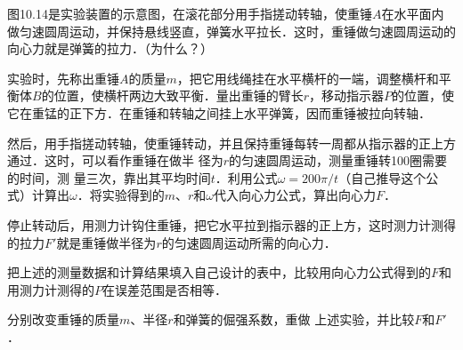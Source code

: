 图10.14是实验装置的示意图，在滚花部分用手指搓动转轴，使重锤$A$在水平面内做匀速圆周运动，并保持悬线竖直，弹簧水平拉长．这时，重锤做匀速圆周运动的向心力就是弹簧的拉力．（为什么？）

实验时，先称出重锤$A$的质量$m$，把它用线绳挂在水平横杆的一端，调整横杆和平衡体$B$的位置，使横杆两边大致平衡．量出重锤的臂长$r$，移动指示器$P$的位置，使它在重锰的正下方．在重锤和转轴之间挂上水平弹簧，因而重锤被拉向转轴．

然后，用手指搓动转轴，使重锤转动，并且保持重锤每转一周都从指示器的正上方通过．这时，可以看作重锤在做半
径为$r$的匀速圆周运动，测量重锤转100圈需要的时间，测
量三次，靠出其平均时间$t$．利用公式$\omega=200\pi/t$（自己推导这个公式）计算出$\omega$．将实验得到的$m$、$r$和$\omega$代入向心力公式，算出向心力$F$．

停止转动后，用测力计钩住重锤，把它水平拉到指示器的正上方，这时测力计测得的拉力$F'$就是重锤做半径为$r$的匀速圆周运动所需的向心力．

把上述的测量数据和计算结果填入自己设计的表中，比较用向心力公式得到的$F$和用测力计测得的$P$在误差范围是否相等．

分别改变重锤的质量$m$、半径$r$和弹簧的倔强系数，重做
上述实验，并比较$F$和$F'$．
\newpage
